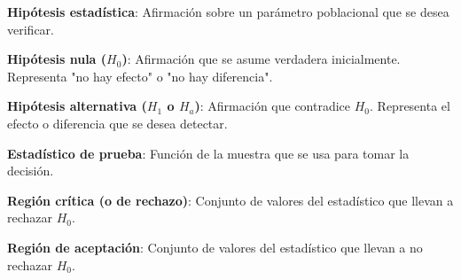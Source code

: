 \documentclass[10pt,a4paper]{article}
\begin{document}
\pagebreak


\begin{tcolorbox}[title=Definiciones Básicas]
    \textbf{Hipótesis estadística}: Afirmación sobre un parámetro poblacional que se desea verificar.
    
    \textbf{Hipótesis nula ($H_0$)}: Afirmación que se asume verdadera inicialmente. Representa "no hay efecto" o "no hay diferencia".
    
    \textbf{Hipótesis alternativa ($H_1$ o $H_a$)}: Afirmación que contradice $H_0$. Representa el efecto o diferencia que se desea detectar.
    
    \textbf{Estadístico de prueba}: Función de la muestra que se usa para tomar la decisión.
    
    \textbf{Región crítica (o de rechazo)}: Conjunto de valores del estadístico que llevan a rechazar $H_0$.
    
    \textbf{Región de aceptación}: Conjunto de valores del estadístico que llevan a no rechazar $H_0$.
\end{tcolorbox}
\end{document}
